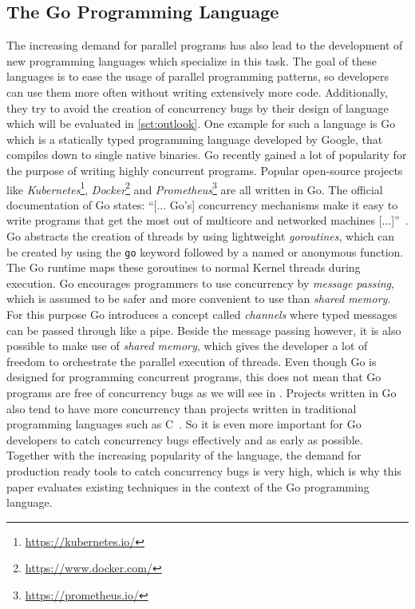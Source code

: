 \documentclass[conference]{IEEEtran}
\begin{document}
\subsection{The Go Programming Language}
The increasing demand for parallel programs has also lead to the development of new programming languages which specialize in this task.
The goal of these languages is to ease the usage of parallel programming patterns, so developers can use them more often without writing extensively more code.
Additionally, they try to avoid the creation of concurrency bugs by their design of language which will be evaluated in \cref{sct:outlook}.
One example for such a language is Go which is a statically typed programming language developed by Google, that compiles down to single native binaries.
Go recently gained a lot of popularity for the purpose of writing highly concurrent programs.
Popular open-source projects like \emph{Kubernetes}\footnote{\url{https://kubernetes.io/}}, \emph{Docker}\footnote{\url{https://www.docker.com/}} and \emph{Prometheus}\footnote{\url{https://prometheus.io/}} are all written in Go.
The official documentation of Go states: ``[... Go's] concurrency mechanisms make it easy to write programs that get the most out of multicore and networked machines [...]''~\cite{goDocs}.
Go abstracts the creation of threads by using lightweight \emph{goroutines}, which can be created by using the \lstinline{go} keyword followed by a named or anonymous function.
The Go runtime maps these goroutines to normal Kernel threads during execution.
Go encourages programmers to use concurrency by \emph{message passing}, which is assumed to be safer and more convenient to use than \emph{shared memory}.
For this purpose Go introduces a concept called \emph{channels} where typed messages can be passed through like a pipe.
Beside the message passing however, it is also possible to make use of \emph{shared memory}, which gives the developer a lot of freedom to orchestrate the parallel execution of threads.
Even though Go is designed for programming concurrent programs, this does not mean that Go programs are free of concurrency bugs as we will see in .
Projects written in Go also tend to have more concurrency than projects written in traditional programming languages such as C~\cite{tu2019go}.
So it is even more important for Go developers to catch concurrency bugs effectively and as early as possible.
Together with the increasing popularity of the language, the demand for production ready tools to catch concurrency bugs is very high, which is why this paper evaluates existing techniques in the context of the Go programming language.
\end{document}
